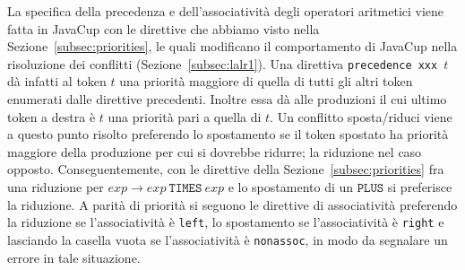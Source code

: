 La specifica della precedenza e dell'associativit\`a degli operatori
aritmetici viene fatta in JavaCup con le direttive che abbiamo visto nella
Sezione~\ref{subsec:priorities}, le quali modificano il comportamento
di JavaCup nella risoluzione dei conflitti (Sezione~\ref{subsec:lalr1}).
Una direttiva \texttt{precedence xxx $t$} d\`a infatti al token $t$ una
priorit\`a maggiore di quella di tutti gli altri token enumerati dalle
direttive precedenti. Inoltre essa d\`a alle produzioni il cui ultimo
token a destra \`e $t$ una priorit\`a pari a quella di $t$. Un conflitto
sposta/riduci viene a questo punto risolto preferendo lo spostamento se il
token spostato ha priorit\`a maggiore della produzione per cui si dovrebbe
ridurre; la riduzione nel caso opposto. Conseguentemente, con le direttive
della Sezione~\ref{subsec:priorities} fra una riduzione per
$\mathit{exp}\to\mathit{exp}\ \mathtt{TIMES}\ \mathit{exp}$ e lo spostamento
di un $\mathtt{PLUS}$ si preferisce la riduzione. A parit\`a di
priorit\`a si seguono le direttive di associativit\`a preferendo la
riduzione se l'associativit\`a \`e \texttt{left}, lo spostamento
se l'associativit\`a \`e \texttt{right} e lasciando la casella vuota
se l'associativit\`a \`e \texttt{nonassoc}, in modo da segnalare un errore
in tale situazione.

